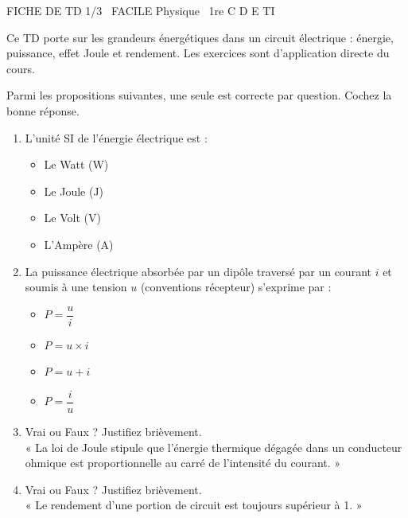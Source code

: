 \documentclass[11pt]{article}
\begin{document}
\begin{tcolorbox}[enhanced,colback=popink,colframe=popink,arc=10pt,boxrule=0pt,left=12pt,right=12pt,top=9pt,bottom=9pt]
{\color{white}\popxbold\small FICHE DE TD 1/3 \textbullet\ FACILE \hfill Physique \textbullet\ 1re C D E TI\par}
\end{tcolorbox}
\vspace{4pt}
Ce TD porte sur les grandeurs énergétiques dans un circuit électrique : énergie, puissance, effet Joule et rendement. Les exercices sont d'application directe du cours.

\begin{exercice}
Parmi les propositions suivantes, une seule est correcte par question. Cochez la bonne réponse.
\begin{enumerate}
    \item L'unité SI de l'énergie électrique est : 
    \begin{itemize}
        \item[A)] Le Watt (W)
        \item[B)] Le Joule (J)
        \item[C)] Le Volt (V)
        \item[D)] L'Ampère (A)
    \end{itemize}
    \item La puissance électrique absorbée par un dipôle traversé par un courant $i$ et soumis à une tension $u$ (conventions récepteur) s'exprime par :
    \begin{itemize}
        \item[A)] $P = \dfrac{u}{i}$
        \item[B)] $P = u \times i$
        \item[C)] $P = u + i$
        \item[D)] $P = \dfrac{i}{u}$
    \end{itemize}
    \item Vrai ou Faux ? Justifiez brièvement.\\
    « La loi de Joule stipule que l'énergie thermique dégagée dans un conducteur ohmique est proportionnelle au carré de l'intensité du courant. »
    \item Vrai ou Faux ? Justifiez brièvement.\\
    « Le rendement d'une portion de circuit est toujours supérieur à 1. »
\end{enumerate}
\end{exercice}
\end{document}
